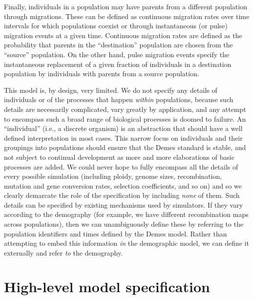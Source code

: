 \documentclass[11pt]{article}
\begin{document}
Finally, individuals in a population may have parents from a different
population through migrations. These can be defined as continuous migration
rates over time intervals for which populations coexist or through
instantaneous (or pulse) migration events at a given time. Continuous migration
rates are defined as the probability that parents in the ``destination''
population are chosen from the ``source'' population.
On the other hand, pulse
migration events specify the instantaneous replacement of a given fraction of
individuals in a destination population by individuals with parents from a
source population.

This model is, by design, very limited. We do not specify any details of
individuals or of the processes that happen \emph{within} populations,
because such details are necessarily complicated, vary greatly by
application, and any attempt to encompass such a broad range of biological
processes is doomed to failure. An ``individual'' (i.e., a discrete
organism) is an abstraction that should have a well defined interpretation
in most cases.
This narrow focus on individuals and their groupings into populations
should ensure that the Demes standard is stable, and not subject to
continual development as more and more elaborations of basic processes
are added. We could never hope to fully encompass all the details
of every possible simulation (including ploidy,
genome sizes, recombination, mutation and gene conversion rates,
selection coefficients, and so on) and so we clearly demarcate the
role of the specification by including \emph{none} of them.
Such details can be specified by existing mechanisms used by
simulators. If they vary according to the demography (for example,
we have different recombination maps across populations), then
we can unambiguously define these by referring to the population
identifiers and times defined by the Demes model. Rather than attempting
to embed this information \emph{in} the demographic model, we
can define it externally and refer \emph{to} the demography.

\section{High-level model specification}\label{sec:appendix-spec}
\end{document}
